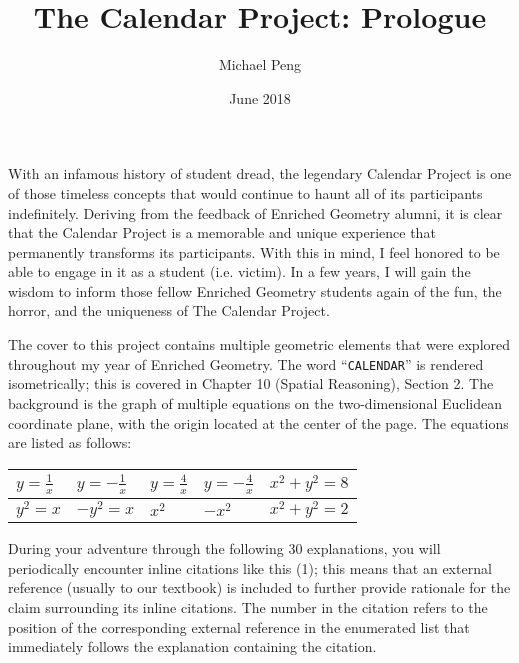 \documentclass[letterpaper,11pt]{article}
\begin{document}
\title{The Calendar Project: Prologue}
\author{Michael Peng}
\date{June 2018}
\maketitle

With an infamous history of student dread, the legendary Calendar Project is one of those timeless concepts that would continue to haunt all of its participants indefinitely. Deriving from the feedback of Enriched Geometry alumni, it is clear that the Calendar Project is a memorable and unique experience that permanently transforms its participants. With this in mind, I feel honored to be able to engage in it as a student (i.e. victim). In a few years, I will gain the wisdom to inform those fellow Enriched Geometry students again of the fun, the horror, and the uniqueness of The Calendar Project\texttrademark.
 
The cover to this project contains multiple geometric elements that were explored throughout my year of Enriched Geometry. The word ``\texttt{CALENDAR}'' is rendered isometrically; this is covered in Chapter 10 (Spatial Reasoning), Section 2. The background is the graph of multiple equations on the two-dimensional Euclidean coordinate plane, with the origin located at the center of the page. The equations are listed as follows:


\begin{center}
\renewcommand{\arraystretch}{1.4}
\begin{tabular}{|l|l|l|l|l|}
\hline
$y=\frac{1}{x}$ & $y=-\frac{1}{x}$ & $y=\frac{4}{x}$ & $y=-\frac{4}{x}$ & $x^2+y^2=8$ \\
\hline
$y^2=x$ & $-y^2=x$ & $x^2$ & $-x^2$ & $x^2+y^2=2$ \\
\hline
\end{tabular}
\end{center}

During your adventure through the following 30 explanations, you will periodically encounter inline citations like this (1); this means that an external reference (usually to our textbook) is included to further provide rationale for the claim surrounding its inline citations. The number in the citation refers to the position of the corresponding external reference in the enumerated list that immediately follows the explanation containing the citation.
\end{document}
